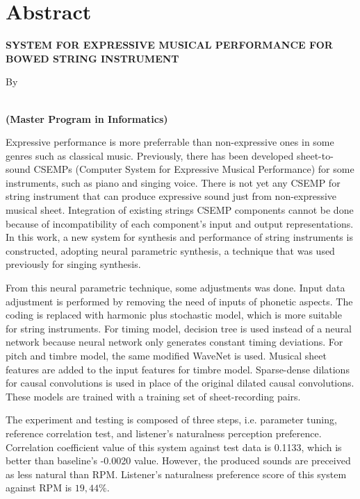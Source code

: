 \clearpage
\chapter*{Abstract}
\begin{center}
	\singlespacing
    \large \bfseries \MakeUppercase{System for Expressive Musical Performance for Bowed String Instrument} %

    \normalsize \normalfont By

    \bfseries \large \theauthor\\
    \normalsize (Master Program in Informatics)
    \bigskip
\end{center}

\begin{singlespace}

Expressive performance is more preferrable than non-expressive ones in some genres such as classical music. Previously, there has been developed sheet-to-sound CSEMPs (Computer System for Expressive Musical Performance) for some instruments, such as piano and singing voice. There is not yet any CSEMP for string instrument that can produce expressive sound just from non-expressive musical sheet. Integration of existing strings CSEMP components cannot be done because of incompatibility of each component's input and output representations. In this work, a new system for synthesis and performance of string instruments is constructed, adopting neural parametric synthesis, a technique that was used previously for singing synthesis.

From this neural parametric technique, some adjustments was done. Input data adjustment is performed by removing the need of inputs of phonetic aspects. The coding is replaced with harmonic plus stochastic model, which is more suitable for string instruments. For timing model, decision tree is used instead of a neural network because neural network only generates constant timing deviations. For pitch and timbre model, the same modified WaveNet is used. Musical sheet features are added to the input features for timbre model. Sparse-dense dilations for causal convolutions is used in place of the original dilated causal convolutions. These models are trained with a training set of sheet-recording pairs.

The experiment and testing is composed of three steps, i.e. parameter tuning, reference correlation test, and listener's naturalness perception preference. Correlation coefficient value of this system against test data is 0.1133, which is better than baseline's -0.0020 value. However, the produced sounds are preceived as less natural than RPM. Listener's naturalness preference score of this system against RPM is $19,44\%$.

\end{singlespace}
\clearpage